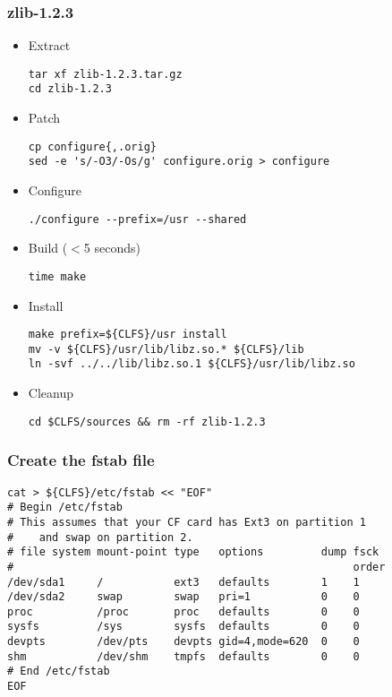  \subsubsection{zlib-1.2.3}
 \begin{itemize}
  \item Extract
\begin{lstlisting}
tar xf zlib-1.2.3.tar.gz
cd zlib-1.2.3
\end{lstlisting}
  \item Patch
\begin{lstlisting}
cp configure{,.orig}
sed -e 's/-O3/-Os/g' configure.orig > configure
\end{lstlisting}
  \item Configure
\begin{lstlisting}
./configure --prefix=/usr --shared
\end{lstlisting}
  \item Build ($<$5 seconds)
\begin{lstlisting}
time make
\end{lstlisting}
  \item Install
\begin{lstlisting}
make prefix=${CLFS}/usr install
mv -v ${CLFS}/usr/lib/libz.so.* ${CLFS}/lib
ln -svf ../../lib/libz.so.1 ${CLFS}/usr/lib/libz.so
\end{lstlisting}
  \item Cleanup
\begin{lstlisting}
cd $CLFS/sources && rm -rf zlib-1.2.3
\end{lstlisting}
\end{itemize}
 \subsubsection{Create the fstab file}
\begin{lstlisting}
cat > ${CLFS}/etc/fstab << "EOF"
# Begin /etc/fstab
# This assumes that your CF card has Ext3 on partition 1
#    and swap on partition 2.
# file system mount-point type   options         dump fsck
#                                                     order
/dev/sda1     /           ext3   defaults        1    1
/dev/sda2     swap        swap   pri=1           0    0
proc          /proc       proc   defaults        0    0
sysfs         /sys        sysfs  defaults        0    0
devpts        /dev/pts    devpts gid=4,mode=620  0    0
shm           /dev/shm    tmpfs  defaults        0    0
# End /etc/fstab
EOF
\end{lstlisting}
